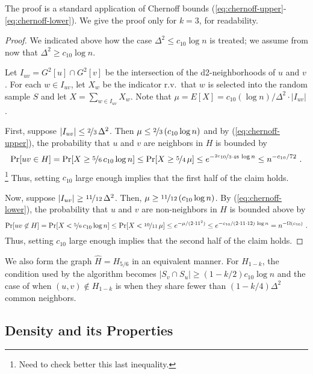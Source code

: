 The proof is a standard application of Chernoff bounds (\ref{eq:chernoff-upper}-\ref{eq:chernoff-lower}). We give the proof only for $k=3$, for readability.
\begin{proof}
We indicated above how the case $\Delta^2 \le c_{10}\log n$ is treated; we assume from now that $\Delta^2 \ge c_{10}\log n$.

Let $I_{uv} = G^2[u]\cap G^2[v]$ be the intersection of the d2-neighborhoods of $u$ and $v$. 
For each $w \in I_{uv}$, let $X_w$ be the indicator r.v.\ that $w$ is
selected into the random sample $S$ and let $X = \sum_{w \in I_{uv}} X_w$. Note that $\mu = E[X] = c_{10} (\log n)/\Delta^2 \cdot |I_{uv}|$.

First, suppose $|I_{uv}| \le \nicefrac{2}{3}\, \Delta^2$.
Then $\mu \le \nicefrac{2}{3}\, (c_{10}\log n)$ and
by (\ref{eq:chernoff-upper}), the probability that $u$ and $v$ are neighbors in $H$ is bounded by
  \[ \Pr[uv \in H] = \Pr[X \ge \nicefrac{5}{6}\, c_{10} \log n]
\le \Pr[X \ge \nicefrac{5}{4}\,\mu] \le e^{-\nicefrac{2c_{10}}{3\cdot 48}\, \log n} \le n^{-c_{10}/72}\ . \]
\footnote{Need to check better this last inequality.} 
Thus, setting $c_{10}$ large enough implies that the first half of the claim holds.

Now, suppose $|I_{uv}| \ge \nicefrac{11}{12}\, \Delta^2$.
Then, $\mu \ge \nicefrac{11}{12}\, (c_{10}\log n)$.
By (\ref{eq:chernoff-lower}), the probability that $u$ and $v$ are non-neighbors in $H$ is bounded above by
  \[ \Pr[uv \not\in H] = \Pr[X < \nicefrac{5}{6}\, c_{10} \log n]
\le \Pr[X < \nicefrac{10}{11}\,\mu] \le e^{-\mu/(2\cdot 11^2)} \le e^{-c_{10}/(2\cdot 11 \cdot 12)\, \log n} = n^{-\Omega(c_{10})}\ . \]
Thus, setting $c_{10}$ large enough implies that the second half of the claim holds.
\end{proof}


We also form the graph $\hat{H} = H_{5/6}$ in an equivalent manner.
For $H_{1-k}$, the condition used by the algorithm becomes $|S_v \cap S_u| \ge (1-k/2)c_{10} \log n$ and the case of when $(u,v) \not\in H_{1-k}$ is when they share fewer than $(1-k/4)\Delta^2$ common neighbors.

\subsection{Density and its Properties}

